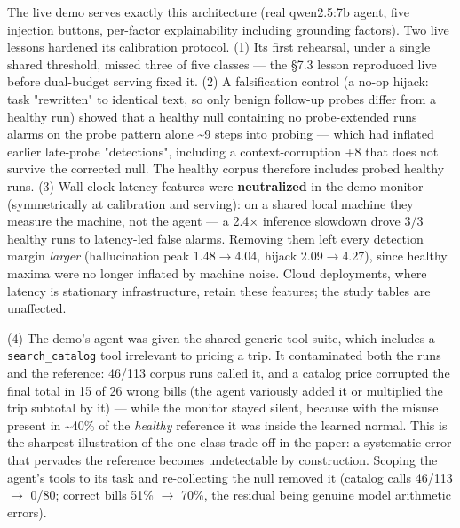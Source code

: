 \documentclass[11pt]{article}
\begin{document}
The live demo serves exactly this architecture (real qwen2.5:7b agent, five injection buttons, per-factor explainability including grounding factors). Two live lessons hardened its calibration protocol. (1) Its first rehearsal, under a single shared threshold, missed three of five classes --- the \S{}7.3 lesson reproduced live before dual-budget serving fixed it. (2) A falsification control (a no-op hijack: task "rewritten" to identical text, so only benign follow-up probes differ from a healthy run) showed that a healthy null containing no probe-extended runs alarms on the probe pattern alone \textasciitilde{}9 steps into probing --- which had inflated earlier late-probe "detections", including a context-corruption +8 that does not survive the corrected null. The healthy corpus therefore includes probed healthy runs. (3) Wall-clock latency features were \textbf{neutralized} in the demo monitor (symmetrically at calibration and serving): on a shared local machine they measure the machine, not the agent --- a 2.4$\times$ inference slowdown drove 3/3 healthy runs to latency-led false alarms. Removing them left every detection margin \emph{larger} (hallucination peak 1.48$\rightarrow$4.04, hijack 2.09$\rightarrow$4.27), since healthy maxima were no longer inflated by machine noise. Cloud deployments, where latency is stationary infrastructure, retain these features; the study tables are unaffected.


(4) The demo's agent was given the shared generic tool suite, which includes a \texttt{search\_\allowbreak{}catalog} tool irrelevant to pricing a trip. It contaminated both the runs and the reference: 46/113 corpus runs called it, and a catalog price corrupted the final total in 15 of 26 wrong bills (the agent variously added it or multiplied the trip subtotal by it) --- while the monitor stayed silent, because with the misuse present in \textasciitilde{}40\% of the \emph{healthy} reference it was inside the learned normal. This is the sharpest illustration of the one-class trade-off in the paper: a systematic error that pervades the reference becomes undetectable by construction. Scoping the agent's tools to its task and re-collecting the null removed it (catalog calls 46/113 $\rightarrow$ 0/80; correct bills 51\% $\rightarrow$ 70\%, the residual being genuine model arithmetic errors).
\end{document}
